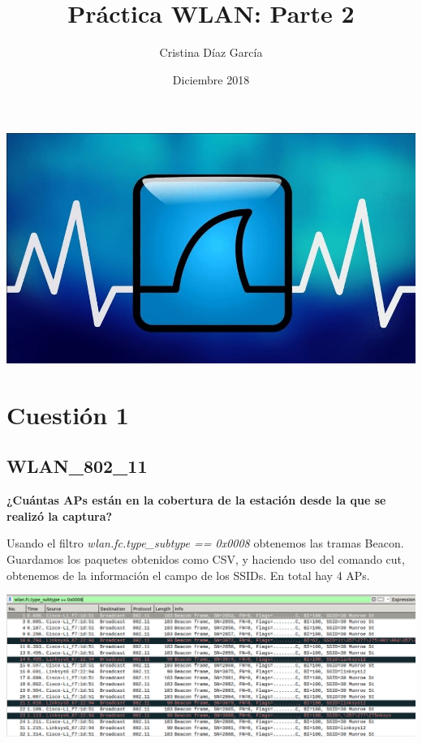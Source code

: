 \documentclass{article}
\title{Práctica WLAN: Parte 2}
\author{Cristina Díaz García}
\date{Diciembre 2018}
\begin{document}

\begin{titlingpage}
\maketitle

\begin{center}
\includegraphics[scale=0.4]{WLAN/wireshark.jpg} 
\end{center}

\end{titlingpage}

\newpage

\tableofcontents

\newpage

\section{Cuestión 1}

\subsection{WLAN\_802\_11}

\textbf{¿Cuántas APs están en la cobertura de la estación desde la que se realizó la captura?}

Usando el filtro \textit{wlan.fc.type\_subtype == 0x0008} obtenemos las tramas Beacon. Guardamos los paquetes obtenidos como CSV, y haciendo uso del comando cut, obtenemos de la información el campo de los SSIDs. En total hay 4 APs.

\begin{center}
\includegraphics[scale=0.3]{WLAN/SSIDs.png}
\end{center}
\end{document}

